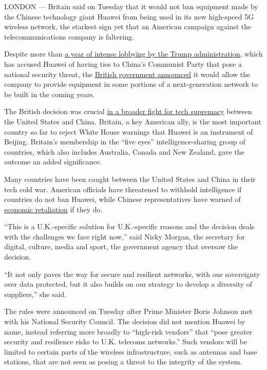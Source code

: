 LONDON --- Britain said on Tuesday that it would not ban equipment made
by the Chinese technology giant Huawei from being used in its new
high-speed 5G wireless network, the starkest sign yet that an American
campaign against the telecommunications company is faltering.

Despite more than
\href{https://www.nytimes.com/2019/05/15/business/huawei-ban-trump.html}{a
year of intense lobbying by the Trump administration}, which has accused
Huawei of having ties to China's Communist Party that pose a national
security threat, the
\href{https://www.gov.uk/government/news/new-plans-to-safeguard-countrys-telecoms-network-and-pave-way-for-fast-reliable-and-secure-connectivity}{British
government announced} it would allow the company to provide equipment in
some portions of a next-generation network to be built in the coming
years.

The British decision was crucial
\href{https://www.nytimes.com/2020/01/16/world/europe/huawei-germany-china-5g-automakers.html}{in
a broader fight for tech supremacy} between the United States and China.
Britain, a key American ally, is the most important country so far to
reject White House warnings that Huawei is an instrument of Beijing.
Britain's membership in the ``five eyes'' intelligence-sharing group of
countries, which also includes Australia, Canada and New Zealand, gave
the outcome an added significance.

Many countries have been caught between the United States and China in
their tech cold war. American officials have threatened to withhold
intelligence if countries do not ban Huawei, while Chinese
representatives have warned of
\href{https://www.nytimes.com/2019/12/20/technology/faroe-islands-huawei-china-us.html}{economic
retaliation} if they do.

``This is a U.K.-specific solution for U.K.-specific reasons and the
decision deals with the challenges we face right now,'' said Nicky
Morgan, the secretary for digital, culture, media and sport, the
government agency that oversaw the decision.

``It not only paves the way for secure and resilient networks, with our
sovereignty over data protected, but it also builds on our strategy to
develop a diversity of suppliers,'' she said.

The rules were announced on Tuesday after Prime Minister Boris Johnson
met with his National Security Council. The decision did not mention
Huawei by name, instead referring more broadly to ``high-risk vendors''
that ``pose greater security and resilience risks to U.K. telecoms
networks.'' Such vendors will be limited to certain parts of the
wireless infrastructure, such as antennas and base stations, that are
not seen as posing a threat to the integrity of the system.


